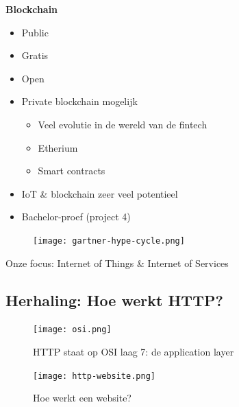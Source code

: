 \documentclass{article}
\newcommand{\bold}[1]{\textbf{#1}}
\begin{document}
\bold{Blockchain}
\begin{itemize}
    \item Public
    \item Gratis
    \item Open
\end{itemize}

\begin{itemize}
    \item Private blockchain mogelijk
    \begin{itemize}
        \item Veel evolutie in de wereld van de fintech
        \item Etherium
        \item Smart contracts
    \end{itemize}
    \item IoT \& blockchain zeer veel potentieel
    \item Bachelor-proef (project 4)
\end{itemize}

\begin{figure}[H]
    \centering
    \texttt{[image: gartner-hype-cycle.png]}
    \caption{}
\end{figure}

Onze focus: Internet of Things \& Internet of Services

\subsection{Herhaling: Hoe werkt HTTP?}
\begin{figure}[H]
    \centering
    \texttt{[image: osi.png]}
    \caption{HTTP staat op OSI laag 7: de application layer}
\end{figure}

\begin{figure}[H]
    \centering
    \texttt{[image: http-website.png]}
    \caption{Hoe werkt een website?}
\end{figure}
\end{document}
